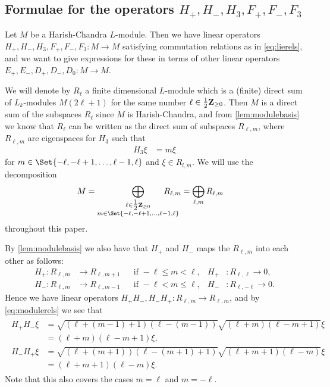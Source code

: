 \subsection{Formulae for the operators \texorpdfstring{$H_+,H_-,H_3,F_+,F_-,F_3$}{H\_+,H\_-,H\_3,F\_+,F\_-,F\_3}}

Let $M$ be a Harish-Chandra $L$-module. Then we have linear operators $H_+,H_-,H_3,F_+,F_-,F_3\colon M\to M$ satisfying commutation relations as in \cref{eq:lierels}, and we want to give expressions for these in terms of other linear operators $E_+,E_-,D_+,D_-,D_0\colon M\to M$. 

We will denote by $R_\ell$ a finite dimensional $L$-module which is a (finite) direct sum of $L_k$-modules $M(2\ell+1)$ for the same number $\ell\in\tfrac{1}{2}\mathbf{Z}_{\geq 0}$. Then $M$ is a direct sum of the subspaces $R_\ell$ since $M$ is Harish-Chandra, and from \cref{lem:modulebasis} we know that $R_\ell$ can be written as the direct sum of subspaces $R_{\ell,m}$, where $R_{\ell,m}$ are eigenspaces for $H_3$ such that
\begin{align} \label{eq:H3eigen}
  H_3\xi &= m\xi
\end{align}
for $m\in\Set{-\ell,-\ell+1,\dotsc,\ell-1,\ell}$ and $\xi\in R_{l,m}$. We will use the decomposition
\begin{align*}
  M &= \bigoplus_{\substack{\ell\in\tfrac{1}{2}\Z_{\geq 0} \\ m\in\Set{-\ell,-\ell+1,\dotsc,\ell-1,\ell}}} \!\!\!\!\!\!\!\!\!\!\!\! R_{\ell,m} = \bigoplus_{\ell,m} R_{\ell,m}
\end{align*}
throughout this paper.

By \cref{lem:modulebasis} we also have that $H_+$ and $H_-$ maps the $R_{\ell,m}$ into each other as follows:
\begin{align*}
  H_+\colon R_{\ell,m} &\to R_{\ell,m+1} && \mbox{if }-\ell\leq m<\ell, & H_+&\colon R_{\ell,\ell} \to 0, \\
  H_-\colon R_{\ell,m} &\to R_{\ell,m-1} && \mbox{if }-\ell< m\leq \ell, & H_-&\colon R_{\ell,-\ell} \to 0.
\end{align*}
Hence we have linear operators $H_+H_-,H_-H_+\colon R_{\ell,m}\to R_{\ell,m}$, and by \cref{eq:modulerels} we see that
\begin{align}
  \begin{split} \label{eq:H+H-}
    H_+H_-\xi &= \sqrt{(\ell+(m-1)+1)(\ell-(m-1))}\sqrt{(\ell+m)(\ell-m+1)} \xi \\
    &= (\ell+m)(\ell-m+1)\xi, \\
    H_-H_+\xi &= \sqrt{(\ell+(m+1))(\ell-(m+1)+1)}\sqrt{(\ell+m+1)(\ell-m)} \xi \\
    &= (\ell+m+1)(\ell-m)\xi.
  \end{split}
\end{align}
Note that this also covers the cases $m=\ell$ and $m=-\ell$. 

